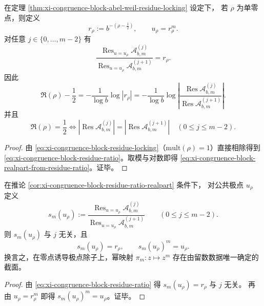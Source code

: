 \begin{corollary}[留数比恢复零点实部与模长平坦判据]\label{cor:xi-congruence-block-residue-ratio-realpart}
在定理 \ref{thm:xi-congruence-block-abel-weil-residue-locking} 设定下，
若 \(\rho\) 为单零点，则定义
\[
r_\rho:=b^{-(\rho-\frac12)},\qquad u_\rho=r_\rho^m.
\]
对任意 \(j\in\{0,\dots,m-2\}\) 有
\begin{equation}\label{eq:xi-congruence-block-residue-ratio}
\frac{\operatorname{Res}_{u=u_\rho}\mathcal A_{b,m}^{(j)}}
{\operatorname{Res}_{u=u_\rho}\mathcal A_{b,m}^{(j+1)}}
=r_\rho.
\end{equation}
因此
\begin{equation}\label{eq:xi-congruence-block-realpart-from-residue-ratio}
\Re(\rho)-\frac12
=-\frac{1}{\log b}\log|r_\rho|
=-\frac{1}{\log b}
\log\left|
\frac{\operatorname{Res}\mathcal A_{b,m}^{(j)}}
{\operatorname{Res}\mathcal A_{b,m}^{(j+1)}}
\right|.
\end{equation}
并且
\[
\Re(\rho)=\frac12
\Longleftrightarrow
\left|\operatorname{Res}\mathcal A_{b,m}^{(j)}\right|
=\left|\operatorname{Res}\mathcal A_{b,m}^{(j+1)}\right|
\quad(0\le j\le m-2).
\]
\end{corollary}

\begin{proof}
由 \eqref{eq:xi-congruence-block-residue-locking}（\(\mathrm{mult}(\rho)=1\)）直接相除得到
\eqref{eq:xi-congruence-block-residue-ratio}。取模与对数即得
\eqref{eq:xi-congruence-block-realpart-from-residue-ratio}。证毕。
\end{proof}

\begin{proposition}[幂覆盖的解析截面由留数比内禀给出]\label{prop:xi-congruence-block-power-cover-section}
在推论 \ref{cor:xi-congruence-block-residue-ratio-realpart} 条件下，
对公共极点 \(u_\rho\) 定义
\[
s_m(u_\rho):=
\frac{\operatorname{Res}_{u=u_\rho}\mathcal A_{b,m}^{(j)}}
{\operatorname{Res}_{u=u_\rho}\mathcal A_{b,m}^{(j+1)}}
\qquad(0\le j\le m-2).
\]
则 \(s_m(u_\rho)\) 与 \(j\) 无关，且
\[
s_m(u_\rho)=r_\rho,\qquad s_m(u_\rho)^m=u_\rho.
\]
换言之，在零点诱导极点除子上，幂映射 \(\pi_m:z\mapsto z^m\) 存在由留数数据唯一确定的截面。
\end{proposition}

\begin{proof}
由 \eqref{eq:xi-congruence-block-residue-ratio} 得 \(s_m(u_\rho)=r_\rho\) 与 \(j\) 无关。
再由 \(u_\rho=r_\rho^m\) 即得 \(s_m(u_\rho)^m=u_\rho\)。证毕。
\end{proof}

